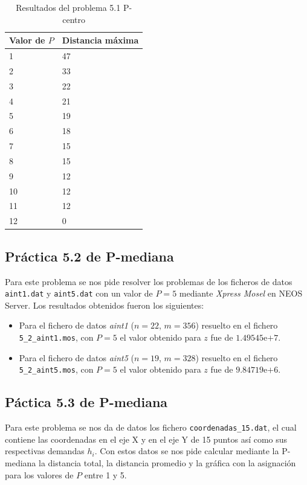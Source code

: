 \documentclass[a4paper,11pt]{article}
\begin{document}
\begin{enumerate}
\begin{table}[!htbp]
\label{5.1_p_centro}
\centering
\begin{tabular}{|l|l|}
\hline
Valor de ${P}$	& Distancia máxima	\\ \hline
1	& 47	\\ \hline
2	& 33	\\ \hline
3	& 22	\\ \hline
4	& 21	\\ \hline
5	& 19	\\ \hline
6	& 18	\\ \hline
7	& 15	\\ \hline
8	& 15	\\ \hline
9	& 12	\\ \hline
10	& 12	\\ \hline
11	& 12	\\ \hline
12	& 0		\\ \hline
\end{tabular}
\caption{Resultados del problema 5.1 P-centro}
\end{table}
\end{enumerate}

\subsection{Práctica 5.2 de P-mediana}

Para este problema se nos pide resolver los problemas de los ficheros de datos \texttt{aint1.dat} y \texttt{aint5.dat} con un valor de ${P=5}$ mediante \textit{Xpress Mosel} en NEOS Server. Los resultados obtenidos fueron los siguientes:

\begin{itemize}
\item Para el fichero de datos \textit{aint1} (${n=22}$, ${m=356}$) resuelto en el fichero \texttt{5\_2\_aint1.mos}, con ${P=5}$ el valor obtenido para ${z}$ fue de ${1.49545\mathrm{e}{+7}}$.

\item Para el fichero de datos \textit{aint5} (${n=19}$, ${m=328}$) resuelto en el fichero \texttt{5\_2\_aint5.mos}, con ${P=5}$ el valor obtenido para ${z}$ fue de ${9.84719\mathrm{e}{+6}}$.
\end{itemize}

\subsection{Páctica 5.3 de P-mediana}

Para este problema se nos da de datos los fichero \texttt{coordenadas\_15.dat}, el cual contiene las coordenadas en el eje X y en el eje Y de 15 puntos así como sus respectivas demandas ${h_i}$. Con estos datos se nos pide calcular mediante la P-mediana la distancia total, la distancia promedio y la gráfica con la asignación para los valores de ${P}$ entre 1 y 5.
\end{document}
